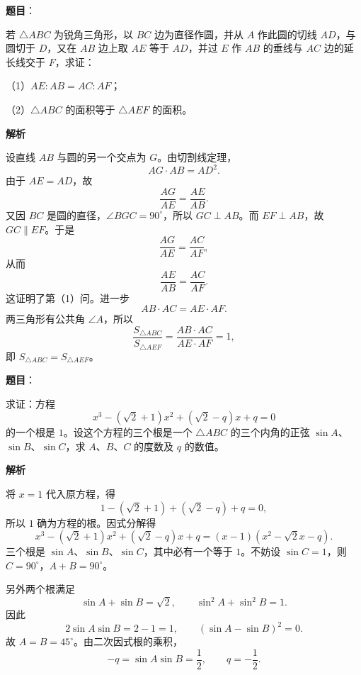 \begin{answer}

\textbf{题目}：

若 $\triangle ABC$ 为锐角三角形，以 $BC$ 边为直径作圆，并从 $A$ 作此圆的切线 $AD$，与圆切于 $D$，又在 $AB$ 边上取 $AE$ 等于 $AD$，并过 $E$ 作 $AB$ 的垂线与 $AC$ 边的延长线交于 $F$，求证：

（1）$AE:AB=AC:AF$；

（2）$\triangle ABC$ 的面积等于 $\triangle AEF$ 的面积。

\textbf{解析}
\nopagebreak[4]
\begin{center}\end{center}
\nopagebreak[4]
设直线 $AB$ 与圆的另一个交点为 $G$。由切割线定理，
\nopagebreak[4]
\[
AG\cdot AB=AD^2.
\]
由于 $AE=AD$，故
\nopagebreak[4]
\[
\frac{AG}{AE}=\frac{AE}{AB}.
\]
又因 $BC$ 是圆的直径，$\angle BGC=90^\circ$，所以 $GC\perp AB$。而 $EF\perp AB$，故 $GC\parallel EF$。于是
\nopagebreak[4]
\[
\frac{AG}{AE}=\frac{AC}{AF},
\]
从而
\nopagebreak[4]
\[
\frac{AE}{AB}=\frac{AC}{AF}.
\]
这证明了第（1）问。进一步
\nopagebreak[4]
\[
AB\cdot AC=AE\cdot AF.
\]
两三角形有公共角 $\angle A$，所以
\nopagebreak[4]
\[
\frac{S_{\triangle ABC}}{S_{\triangle AEF}}
=\frac{AB\cdot AC}{AE\cdot AF}=1,
\]
即 $S_{\triangle ABC}=S_{\triangle AEF}$。


\end{answer}
\begin{answer}

\textbf{题目}：

求证：方程
\nopagebreak[4]
\[
x^3-(\sqrt2+1)x^2+(\sqrt2-q)x+q=0
\]
的一个根是 $1$。设这个方程的三个根是一个 $\triangle ABC$ 的三个内角的正弦 $\sin A$、$\sin B$、$\sin C$，求 $A$、$B$、$C$ 的度数及 $q$ 的数值。

\textbf{解析}

将 $x=1$ 代入原方程，得
\nopagebreak[4]
\[
1-(\sqrt2+1)+(\sqrt2-q)+q=0,
\]
所以 $1$ 确为方程的根。因式分解得
\nopagebreak[4]
\[
x^3-(\sqrt2+1)x^2+(\sqrt2-q)x+q
=(x-1)(x^2-\sqrt2x-q).
\]
三个根是 $\sin A$、$\sin B$、$\sin C$，其中必有一个等于 $1$。不妨设 $\sin C=1$，则 $C=90^\circ$，$A+B=90^\circ$。

另外两个根满足
\nopagebreak[4]
\[
\sin A+\sin B=\sqrt2,
\qquad \sin^2A+\sin^2B=1.
\]
因此
\nopagebreak[4]
\[
2\sin A\sin B=2-1=1,
\qquad (\sin A-\sin B)^2=0.
\]
故 $A=B=45^\circ$。由二次因式根的乘积，
\nopagebreak[4]
\[
-q=\sin A\sin B=\frac12,
\qquad q=-\frac12.
\]


\end{answer}